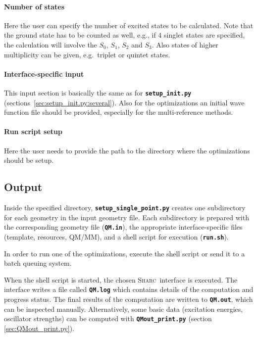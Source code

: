 \documentclass[a4paper,10pt,DIV=15,openany]{scrbook}
\newcommand{\sharc}{\textsc{Sharc}}
\newcommand{\ttt}[1]{\textbf{\texttt{#1}}}
\begin{document}
\paragraph{Number of states}

Here the user can specify the number of excited states to be calculated. Note that the ground state has to be counted as well, e.g., if 4 singlet states are specified, the calculation will involve the $S_0$, $S_1$, $S_2$ and $S_3$. Also states of higher multiplicity can be given, e.g.\ triplet or quintet states. 

\paragraph{Interface-specific input}

This input section is basically the same as for \ttt{setup\_init.py} (sections~\ref{sec:setup_init.py:several}). Also for the optimizations an initial wave function file should be provided, especially for the multi-reference methods.

\paragraph{Run script setup}

Here the user needs to provide the path to the directory where the optimizations should be setup.


\subsection{Output}

Inside the specified directory, \ttt{setup\_single\_point.py} creates one subdirectory for each geometry in the input geometry file.
Each subdirectory is prepared with the corresponding geometry file (\ttt{QM.in}), the appropriate interface-specific files (template, resources, QM/MM), and a shell script for execution (\ttt{run.sh}).

In order to run one of the optimizations, execute the shell script or send it to a batch queuing system.

When the shell script is started, the chosen \sharc\ interface is executed.
The interface writes a file called \ttt{QM.log} which contains details of the computation and progress status.
The final results of the computation are written to \ttt{QM.out}, which can be inspected manually.
Alternatively, some basic data (excitation energies, oscillator strengths) can be computed with \ttt{QMout\_print.py} (section \ref{sec:QMout_print.py}).
\end{document}
